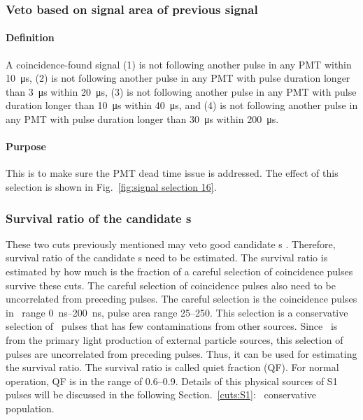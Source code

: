 \subsubsection{Veto based on signal area of previous signal}
\paragraph{Definition}
A coincidence-found signal (1) is not following another pulse in any PMT within \SI{10}{\us}, (2) is not following another pulse in any PMT with pulse duration longer than \SI{3}{\us} within \SI{20}{\us}, (3) is not following another pulse in any PMT with pulse duration longer than \SI{10}{\us} within \SI{40}{\us}, and (4) is not following another pulse in any PMT with pulse duration longer than \SI{30}{\us} within \SI{200}{\us}.
\paragraph{Purpose}
This is to make sure the PMT dead time issue is addressed. The effect of this selection is shown in Fig.~\ref{fig:signal selection 16}.

\subsubsection{Survival ratio of the candidate \ees s}
These two cuts previously mentioned may veto good candidate \ees s . Therefore, survival ratio of the candidate \ees s need to be estimated. The survival ratio is estimated by how much is the fraction of a careful selection of coincidence pulses survive these cuts.
The careful selection of coincidence pulses also need to be uncorrelated from preceding pulses. The careful selection is the coincidence pulses in \ttwoseven\ range \SIrange{0}{200}{\ns},  pulse area range \SIrange{25}{250}{\phe}. This selection is a conservative selection of \sone\ pulses that has few contaminations from other sources. Since \sone\ is from the primary light production of external particle sources, this selection of pulses are uncorrelated from preceding pulses. Thus, it can be used for estimating the survival ratio. The survival ratio is called quiet fraction (QF). For normal operation, QF is in the range of \numrange{0.6}{0.9}. Details of this physical sources of S1 pulses will be discussed in the following Section.~\ref{cuts:S1}: \sone\ conservative population. 

